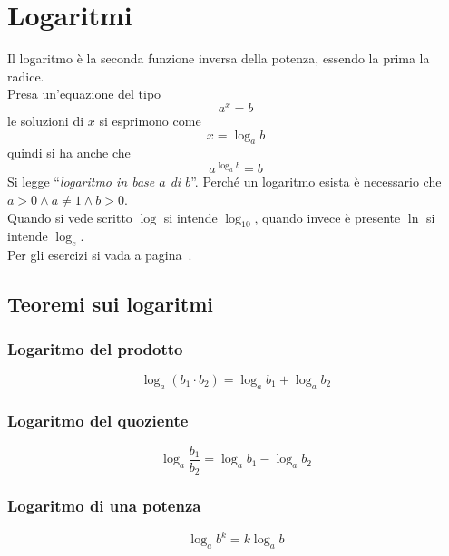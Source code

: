 
\section{Logaritmi}\label{sec:logaritmi}
Il logaritmo è la seconda funzione inversa della potenza, essendo la prima la radice.\\
Presa un'equazione del tipo
\begin{equation*}
a^x=b
\end{equation*}
le soluzioni di $x$ si esprimono come
\begin{equation*}
x = \log_a b
\end{equation*}
quindi si ha anche che 
\begin{equation*}
a^{\log_a b} = b
\end{equation*}
Si legge ``\textit{logaritmo in base $a$ di $b$}''. Perché un logaritmo esista è necessario che
$a>0\land a\neq1\land b > 0$.\\
Quando si vede scritto $\log$ si intende $\log_{10}$, quando invece è presente $\ln$ si intende
$\log_e$.\\
Per gli esercizi si vada a pagina~\pageref{ex:logaritmi}.

\subsection{Teoremi sui logaritmi}
\subsubsection{Logaritmo del prodotto}
\begin{equation*}
\log_a (b_1\cdot b_2) = \log_a b_1 + \log_a b_2
\end{equation*}

\subsubsection{Logaritmo del quoziente}
\begin{equation*}
\log_a\frac{b_1}{b_2} = \log_a b_1 - \log_a b_2
\end{equation*}

\subsubsection{Logaritmo di una potenza}
\begin{equation*}
\log_a b^k = k\log_a b
\end{equation*}

